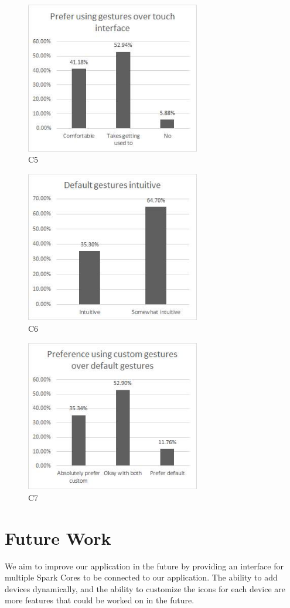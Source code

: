 \documentclass[journal]{IEEEtran}
\begin{document}
\begin{figure}[!t]
\centering
\includegraphics[width=3in]{R5.jpg}
\caption{C5}
\label{fig2}
\end{figure}
\begin{figure}[!t]
\centering
\includegraphics[width=3in]{R7.jpg}
\caption{C6}
\label{fig2}
\end{figure}
\begin{figure}[!t]
\centering
\includegraphics[width=3in]{R6.jpg}
\caption{C7}
\label{fig2}
\end{figure}


\section{Future Work}
We aim to improve our application in the future by providing an interface for multiple Spark Cores to be connected to our application. The ability to add devices dynamically, and the ability to customize the icons for each device are more features that could be worked on in the future.
\end{document}
